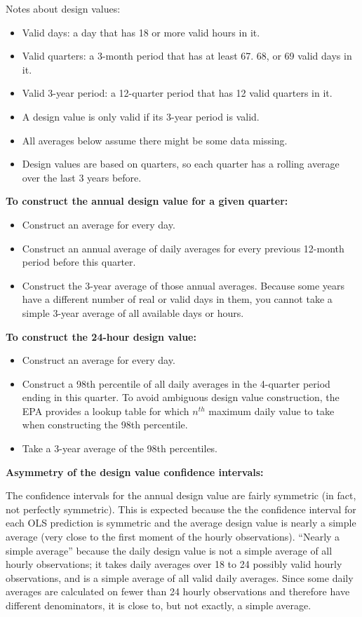 \documentclass[12pt]{article}
\begin{document}
Notes about design values:
\begin{itemize}
\setlength{\itemsep}{0.5em}
    \item Valid days: a day that has 18 or more valid hours in it.
    \item Valid quarters: a 3-month period that has at least 67. 68, or 69 valid days in it.
    \item Valid 3-year period: a 12-quarter period that has 12 valid quarters in it.
    \item A design value is only valid if its 3-year period is valid.
    \item All averages below assume there might be some data missing.
    \item Design values are based on quarters, so each quarter has a rolling average over the last 3 years before.
\end{itemize}
%
\textbf{To construct the annual design value for a given quarter:}
\begin{itemize}
    \item Construct an average for every day.
    \item Construct an annual average of daily averages for every previous 12-month period before this quarter.
    \item Construct the 3-year average of those annual averages. Because some years have a different number of real or valid days in them, you cannot take a simple 3-year average of all available days or hours.
\end{itemize}
%
\textbf{To construct the 24-hour design value:}
\begin{itemize}
    \item Construct an average for every day.
    \item Construct a 98th percentile of all daily averages in the 4-quarter period ending in this quarter. To avoid ambiguous design value construction, the EPA provides a lookup table for which $n^{th}$ maximum daily value to take when constructing the 98th percentile.
    \item Take a 3-year average of the 98th percentiles.
\end{itemize}



\newpage\noindent
\textbf{Asymmetry of the design value confidence intervals:}

The confidence intervals for the annual design value are fairly symmetric (in fact, not perfectly symmetric). This is expected because the the confidence interval for each OLS prediction is symmetric and the average design value is nearly a simple average (very close to the first moment of the hourly observations). ``Nearly a simple average'' because the daily design value is not a simple average of all hourly observations; it takes daily averages over 18 to 24 possibly valid hourly observations, and is a simple average of all valid daily averages. Since some daily averages are calculated on fewer than 24 hourly observations and therefore have different denominators, it is close to, but not exactly, a simple average.
\end{document}
